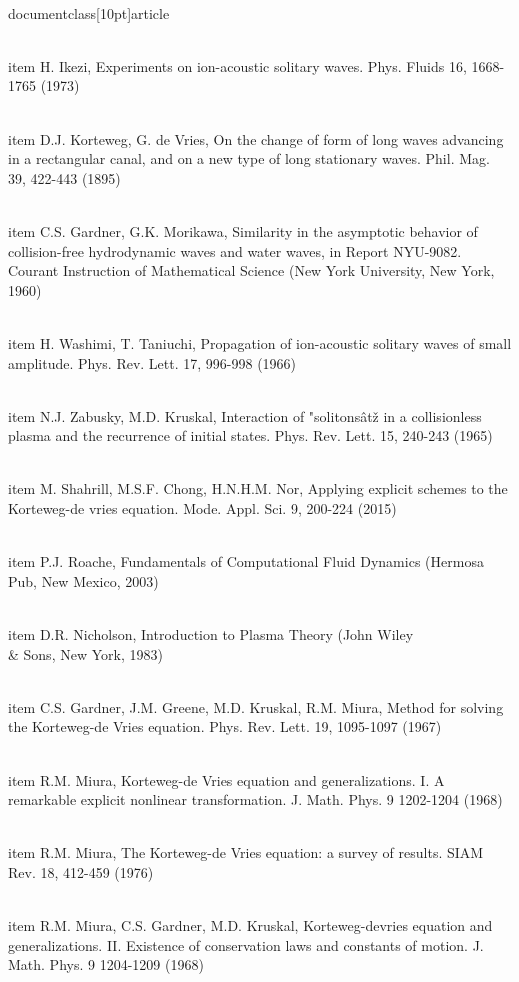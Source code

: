 \\documentclass[10pt]{article}
\begin{document}
{{{{{  \\item H. Ikezi, Experiments on ion-acoustic solitary waves. Phys. Fluids 16, 1668-1765 (1973)

  \\item D.J. Korteweg, G. de Vries, On the change of form of long waves advancing in a rectangular canal, and on a new type of long stationary waves. Phil. Mag. 39, 422-443 (1895)

  \\item C.S. Gardner, G.K. Morikawa, Similarity in the asymptotic behavior of collision-free hydrodynamic waves and water waves, in Report NYU-9082. Courant Instruction of Mathematical Science (New York University, New York, 1960)

  \\item H. Washimi, T. Taniuchi, Propagation of ion-acoustic solitary waves of small amplitude. Phys. Rev. Lett. 17, 996-998 (1966)

  \\item N.J. Zabusky, M.D. Kruskal, Interaction of "solitonsâtž in a collisionless plasma and the recurrence of initial states. Phys. Rev. Lett. 15, 240-243 (1965)

  \\item M. Shahrill, M.S.F. Chong, H.N.H.M. Nor, Applying explicit schemes to the Korteweg-de vries equation. Mode. Appl. Sci. 9, 200-224 (2015)

  \\item P.J. Roache, Fundamentals of Computational Fluid Dynamics (Hermosa Pub, New Mexico, 2003)

  \\item D.R. Nicholson, Introduction to Plasma Theory (John Wiley \\& Sons, New York, 1983)

  \\item C.S. Gardner, J.M. Greene, M.D. Kruskal, R.M. Miura, Method for solving the Korteweg-de Vries equation. Phys. Rev. Lett. 19, 1095-1097 (1967)

  \\item R.M. Miura, Korteweg-de Vries equation and generalizations. I. A remarkable explicit nonlinear transformation. J. Math. Phys. 9 1202-1204 (1968)

  \\item R.M. Miura, The Korteweg-de Vries equation: a survey of results. SIAM Rev. 18, 412-459 (1976)

  \\item R.M. Miura, C.S. Gardner, M.D. Kruskal, Korteweg-devries equation and generalizations. II. Existence of conservation laws and constants of motion. J. Math. Phys. 9 1204-1209 (1968)

}}}}}
\end{document}
